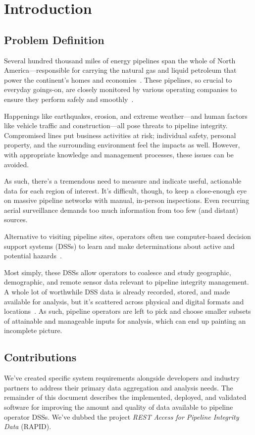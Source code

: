 \chapter{Introduction}
\label{intro}

\section{Problem Definition}
\label{Problem}
Several hundred thousand miles of energy pipelines span the whole of North America---responsible for carrying the natural gas and liquid petroleum that power the continent's homes and economies~\cite{PHMSA}. These pipelines, so crucial to everyday goings-on, are closely monitored by various operating companies to ensure they perform safely and smoothly~\cite{PHMSA2013}.

Happenings like earthquakes, erosion, and extreme weather---and human factors like vehicle traffic and construction---all pose threats to pipeline integrity. Compromised lines put business activities at risk; individual safety, personal property, and the surrounding environment feel the impacts as well. However, with appropriate knowledge and management processes, these issues can be avoided.

As such, there's a tremendous need to measure and indicate useful, actionable data for each region of interest. It's difficult, though, to keep a close-enough eye on massive pipeline networks with manual, in-person inspections. Even recurring aerial surveillance demands too much information from too few (and distant) sources.

Alternative to visiting pipeline sites, operators often use computer-based decision support systems (DSSs) to learn and make determinations about active and potential hazards~\cite{PHMSA2013,Dunning2013}. 

Most simply, these DSSs allow operators to coalesce and study geographic, demographic, and remote sensor data relevant to pipeline integrity management. A whole lot of worthwhile DSS data is already recorded, stored, and made available for analysis, but it's scattered across physical and digital formats and locations~\cite{Dunning2013}. As such, pipeline operators are left to pick and choose smaller subsets of attainable and manageable inputs for analysis, which can end up painting an incomplete picture.

\section{Contributions}
We've created specific system requirements alongside developers and industry partners to address their primary data aggregation and analysis needs. The remainder of this document describes the implemented, deployed, and validated software for improving the amount and quality of data available to pipeline operator DSSs. We've dubbed the project \textit{REST Access for Pipeline Integrity Data} (RAPID).

